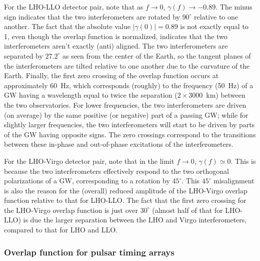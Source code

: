 For the LHO-LLO detector pair,
note that as $f\rightarrow 0$, $\gamma(f)\rightarrow -0.89$.
The minus sign indicates that the two interferometers
are rotated by $90^\circ$ relative to one another.
The fact that the absolute value $|\gamma(0)|=0.89$ is 
not exactly equal to 1, even though the overlap function
is normalized, indicates that the two interferometers
aren't exactly (anti) aligned.
The two interferometers are separated by $27.2^\circ$ as 
seen from the center of the Earth, so the tangent planes 
of the interferometers are tilted relative to one another due 
to the curvature of the Earth.
Finally, the first zero crossing of the overlap function
occurs at approximately 60~Hz, which corresponds (roughly)
to the frequency (50~Hz) of a GW having a wavelength 
equal to 
twice the separation ($2\times 3000$~km) between the two observatories.
For lower frequencies, the two interferometers are driven
(on average) by the same positive (or negative) part of a passing GW;
while for slightly larger frequencies, the two interferometers 
will start to be driven by parts of the GW having opposite signs.  
The zero crossings correspond to the transitions between
these in-phase and out-of-phase excitations of the 
interferometers.

For the LHO-Virgo detector pair, note 
that in the limit $f\rightarrow 0$, $\gamma(f)\simeq 0$.
This is because the two interferometers effectively respond
to the two orthogonal polarizations of a GW, corresponding 
to a rotation by $45^\circ$.
This $45^\circ$ misalignment is also the reason for the 
(overall) reduced amplitude of the LHO-Virgo overlap 
function relative to that for LHO-LLO.  
The fact that the first zero crossing for the LHO-Virgo 
overlap function is just over $30^\circ$ (almost half of 
that for LHO-LLO) is due the larger separation between the
LHO and Virgo interferometers, compared to that for LHO 
and LLO.

\subsubsection{Overlap function for pulsar timing arrays}

